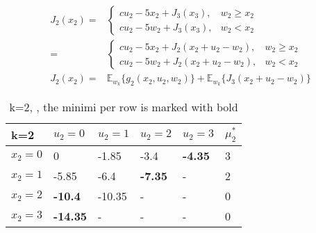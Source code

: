 \documentclass{article}
\begin{document}
\begin{align}
	J_2(x_2) = &
	\begin{cases}
		c u_2 - 5x_2 + J_3(x_3), & w_2 \geq x_2\\
		c u_2 - 5w_2 + J_3(x_3), & w_2 < x_2
	\end{cases}\\
	=& \begin{cases}
		c u_2 - 5x_2 + J_2(x_{2} + u_2 - w_2), & w_2 \geq x_2\\
		c u_2 - 5w_2 + J_2(x_{2} + u_2 - w_2), & w_2 < x_2
	\end{cases}\\
	J_2(x_2) =& \mathbb{E}_{w_k}\lbrace g_2(x_2,u_2,w_2)\rbrace + \mathbb{E}_{w_k}\lbrace J_3(x_{2} + u_2 - w_2)\rbrace 
\end{align}

\begin{table}[h]
	\centering
	\caption{k=2, , the minimi per row is marked with bold}
	\label{tab:k2}
	\begin{tabular}{l|llll|l}
		k=2     & $u_2=0$         & $u_2=1$ & $u_2=2$        & $u_2=3$        & $\mu_2^*$ \\ \hline
		$x_2=0$ & 0               & -1.85   & -3.4           & \textbf{-4.35} & 3         \\
		$x_2=1$ & -5.85           & -6.4    & \textbf{-7.35} & -              & 2         \\
		$x_2=2$ & \textbf{-10.4}  & -10.35  & -              & -              & 0         \\
		$x_2=3$ & \textbf{-14.35} & -       & -              & -              & 0        
	\end{tabular}
\end{table}
\end{document}
